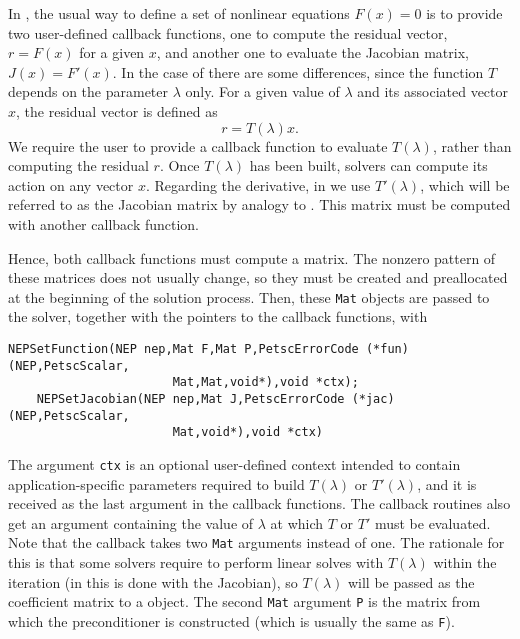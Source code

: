 In , the usual way to define a set of nonlinear equations $F(x)=0$ is to provide two user-defined callback functions, one to compute the residual vector, $r=F(x)$ for a given $x$, and another one to evaluate the Jacobian matrix, $J(x)=F'(x)$.
In the case of  there are some differences, since the function $T$ depends on the parameter $\lambda$ only. For a given value of $\lambda$ and its associated vector $x$, the residual vector is defined as
\begin{equation}
r=T(\lambda)x.\label{eq:nlres}
\end{equation}
We require the user to provide a callback function to evaluate $T(\lambda)$, rather than computing the residual $r$. Once $T(\lambda)$ has been built,  solvers can compute its action on any vector $x$. Regarding the derivative, in  we use $T'(\lambda)$, which will be referred to as the Jacobian matrix by analogy to . This matrix must be computed with another callback function.

Hence, both callback functions must compute a matrix. The nonzero pattern of these matrices does not usually change, so they must be created and preallocated at the beginning of the solution process. Then, these \texttt{Mat} objects are passed to the solver, together with the pointers to the callback functions, with
	\begin{Verbatim}[fontsize=\small]
	NEPSetFunction(NEP nep,Mat F,Mat P,PetscErrorCode (*fun)(NEP,PetscScalar,
                       Mat,Mat,void*),void *ctx);
	NEPSetJacobian(NEP nep,Mat J,PetscErrorCode (*jac)(NEP,PetscScalar,
                       Mat,void*),void *ctx)
	\end{Verbatim}

The argument \texttt{ctx} is an optional user-defined context intended to contain application-specific parameters required to build $T(\lambda)$ or $T'(\lambda)$, and it is received as the last argument in the callback functions. The callback routines also get an argument containing the value of $\lambda$ at which $T$ or $T'$ must be evaluated. Note that the  callback takes two \texttt{Mat} arguments instead of one. The rationale for this is that some  solvers require to perform linear solves with $T(\lambda)$ within the iteration (in  this is done with the Jacobian), so $T(\lambda)$ will be passed as the coefficient matrix to a  object. The second \texttt{Mat} argument \texttt{P} is the matrix from which the preconditioner is constructed (which is usually the same as \texttt{F}).

